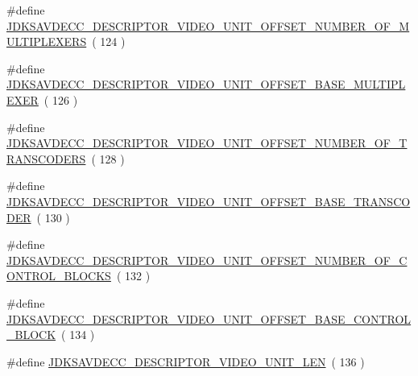 \begin{DoxyCompactItemize}
\#define \hyperlink{group__descriptor__video_gaaa3f2cb2d4292ea708a34493963af129}{J\+D\+K\+S\+A\+V\+D\+E\+C\+C\+\_\+\+D\+E\+S\+C\+R\+I\+P\+T\+O\+R\+\_\+\+V\+I\+D\+E\+O\+\_\+\+U\+N\+I\+T\+\_\+\+O\+F\+F\+S\+E\+T\+\_\+\+N\+U\+M\+B\+E\+R\+\_\+\+O\+F\+\_\+\+M\+U\+L\+T\+I\+P\+L\+E\+X\+E\+RS}~( 124 )
\item 
\#define \hyperlink{group__descriptor__video_ga4240bc910ba7b069f1ae91e73e4b1e83}{J\+D\+K\+S\+A\+V\+D\+E\+C\+C\+\_\+\+D\+E\+S\+C\+R\+I\+P\+T\+O\+R\+\_\+\+V\+I\+D\+E\+O\+\_\+\+U\+N\+I\+T\+\_\+\+O\+F\+F\+S\+E\+T\+\_\+\+B\+A\+S\+E\+\_\+\+M\+U\+L\+T\+I\+P\+L\+E\+X\+ER}~( 126 )
\item 
\#define \hyperlink{group__descriptor__video_ga429b5b0b872caefd7699eefb7c3fd2c3}{J\+D\+K\+S\+A\+V\+D\+E\+C\+C\+\_\+\+D\+E\+S\+C\+R\+I\+P\+T\+O\+R\+\_\+\+V\+I\+D\+E\+O\+\_\+\+U\+N\+I\+T\+\_\+\+O\+F\+F\+S\+E\+T\+\_\+\+N\+U\+M\+B\+E\+R\+\_\+\+O\+F\+\_\+\+T\+R\+A\+N\+S\+C\+O\+D\+E\+RS}~( 128 )
\item 
\#define \hyperlink{group__descriptor__video_ga9d66754acf3cadacf1018ec577ced9ad}{J\+D\+K\+S\+A\+V\+D\+E\+C\+C\+\_\+\+D\+E\+S\+C\+R\+I\+P\+T\+O\+R\+\_\+\+V\+I\+D\+E\+O\+\_\+\+U\+N\+I\+T\+\_\+\+O\+F\+F\+S\+E\+T\+\_\+\+B\+A\+S\+E\+\_\+\+T\+R\+A\+N\+S\+C\+O\+D\+ER}~( 130 )
\item 
\#define \hyperlink{group__descriptor__video_ga3aa3d775aa5b1b17993728f31046ff35}{J\+D\+K\+S\+A\+V\+D\+E\+C\+C\+\_\+\+D\+E\+S\+C\+R\+I\+P\+T\+O\+R\+\_\+\+V\+I\+D\+E\+O\+\_\+\+U\+N\+I\+T\+\_\+\+O\+F\+F\+S\+E\+T\+\_\+\+N\+U\+M\+B\+E\+R\+\_\+\+O\+F\+\_\+\+C\+O\+N\+T\+R\+O\+L\+\_\+\+B\+L\+O\+C\+KS}~( 132 )
\item 
\#define \hyperlink{group__descriptor__video_ga3d81ca59c3abc4945c1bd294177e4ff7}{J\+D\+K\+S\+A\+V\+D\+E\+C\+C\+\_\+\+D\+E\+S\+C\+R\+I\+P\+T\+O\+R\+\_\+\+V\+I\+D\+E\+O\+\_\+\+U\+N\+I\+T\+\_\+\+O\+F\+F\+S\+E\+T\+\_\+\+B\+A\+S\+E\+\_\+\+C\+O\+N\+T\+R\+O\+L\+\_\+\+B\+L\+O\+CK}~( 134 )
\item 
\#define \hyperlink{group__descriptor__video_ga7748447728321b40379327f279dca7de}{J\+D\+K\+S\+A\+V\+D\+E\+C\+C\+\_\+\+D\+E\+S\+C\+R\+I\+P\+T\+O\+R\+\_\+\+V\+I\+D\+E\+O\+\_\+\+U\+N\+I\+T\+\_\+\+L\+EN}~( 136 )
\end{DoxyCompactItemize}
